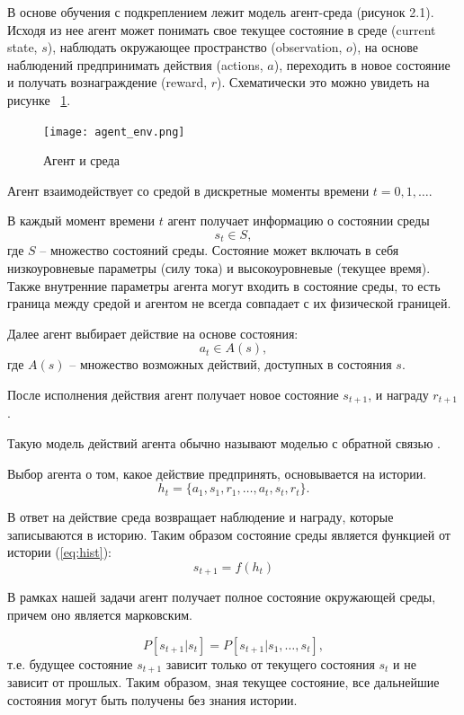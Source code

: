 В основе обучения с подкреплением лежит модель агент-среда (рисунок 2.1). Исходя из нее агент может понимать свое текущее состояние в среде (current state, $s$), наблюдать окружающее пространство (observation, $o$), на основе наблюдений предпринимать действия (actions, $a$), переходить в новое состояние и получать вознаграждение (reward, $r$). Схематически это можно увидеть на рисунке ~\ref{fig:ag-en}.

\begin{figure}[!h]
	\centering
	\texttt{[image: agent\_env.png]}	
	\caption {Агент и среда}
	\label{fig:ag-en}
\end{figure}

Агент взаимодействует со средой в дискретные моменты времени $t=0, 1, \dots$.

В каждый момент времени $t$ агент получает информацию о состоянии среды $$s_t \in S, $$ где $S$ – множество состояний среды. Состояние может включать в себя
низкоуровневые параметры (силу тока) и
высокоуровневые (текущее время). Также внутренние параметры агента могут входить в состояние среды, то есть граница
между средой и агентом не всегда совпадает с их физической границей.


Далее агент выбирает действие на основе состояния: $$a_t \in A(s),$$ 
где $A(s)$ – множество возможных действий, доступных в состояния $s$.

После исполнения действия агент получает новое состояние $s_{t+1}$, и награду $r_{t+1}$. 

Такую модель действий агента обычно называют моделью с обратной связью \cite{rl1}.


Выбор агента о том, какое действие предпринять, основывается на истории. 
\begin{equation}
    h_t = \{a_1, s_1, r_1, \dots, a_t, s_t, r_t\}.
    \label{eq:hist}
\end{equation}

В ответ на действие среда возвращает наблюдение и награду, которые записываются в историю. Таким образом состояние среды является функцией от истории (\ref{eq:hist}):
$$s_{t+1} = f(h_t)$$

В рамках нашей задачи агент получает полное состояние окружающей среды, причем оно  является марковским.

$$P[s_{t+1} | s_t] = P[s_{t+1} | s_1, \dots, s_t],$$
т.е. будущее состояние $s_{t+1}$ зависит только от текущего состояния $s_t$ и не зависит от прошлых. Таким образом, зная текущее состояние, все дальнейшие состояния могут быть получены без знания истории. 
 
